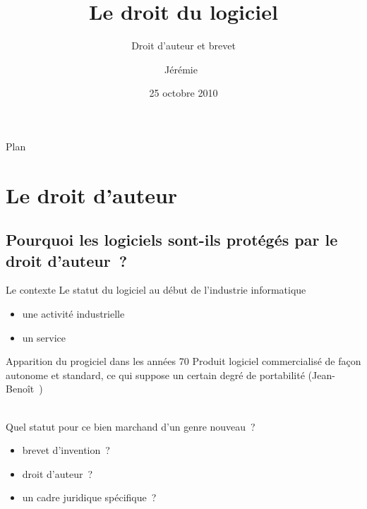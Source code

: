 \documentclass{beamer}
\title{Le droit du logiciel}
\subtitle{Droit d'auteur et brevet}
\author[Decock]{Jérémie~\bsc{Decock}}
\institute{UPMC}
\date{25 octobre 2010}
\begin{document}

\begin{frame}
    \titlepage
\end{frame}


\begin{frame}{Plan}
    \tableofcontents
\end{frame}


\section{Le droit d'auteur}

\subsection{Pourquoi les logiciels sont-ils protégés par le droit d’auteur~?}

\begin{frame}{Le contexte}
    Le statut du logiciel au début de l'industrie informatique
    \begin{itemize}
        \item une activité industrielle
        \item un service
    \end{itemize}
    \begin{block}{Apparition du progiciel dans les années 70}
        \og{}Produit logiciel commercialisé de façon autonome et standard,
        ce qui suppose un certain degré de portabilité\fg{}
        (Jean-Benoît~)
    \end{block}
    ~\\
    Quel statut pour ce bien marchand d'un genre nouveau~?
    \begin{itemize}
        \item brevet d'invention~?
        \item droit d'auteur~?
        \item un cadre juridique spécifique~?
    \end{itemize}
\end{frame}
\end{document}
